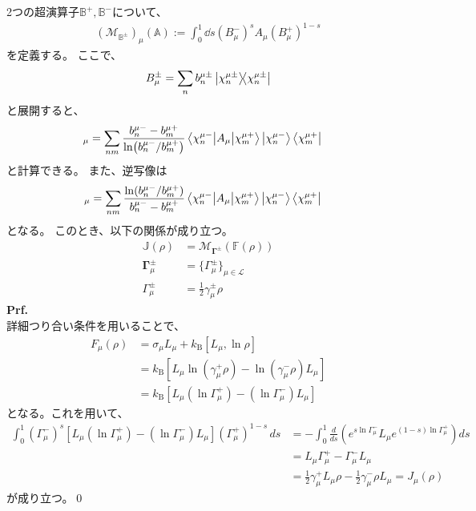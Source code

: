 \documentclass[a4paper,11pt]{jsarticle}
\numberwithin{equation}{section}
\begin{document}
2つの超演算子$\mathbb{B}^{+}, \mathbb{B}^{-} $について、
\begin{align}
    (\mathcal{M}_{\mathbb{B}^{\pm}} )_{\mu} (\mathbb{A}) := \int_{0}^{1} \dd{s} (B_{\mu}^{-})^{s} A_{\mu} (B_{\mu}^{+})^{1-s}
\end{align}
を定義する。
ここで、
\begin{align}
    B_{\mu}^{\pm} = \sum_{n} b_{n}^{\mu\pm} \ketbra{\chi_{n}^{\mu\pm}}
\end{align}
と展開すると、
\begin{align}
[\mathcal{M}_{\mathbb{B}^{\pm}}(\mathbb{A})]_{\mu}
&=
\sum_{n m}
\frac{b_{n}^{\mu -} - b_{m}^{\mu +}}
{\ln (b_{n}^{\mu -} / b_{m}^{\mu +})}
\mel{\chi_{n}^{\mu -}}{A_{\mu}}{\chi_{m}^{\mu +}}
\ket{\chi_{n}^{\mu -}}\bra{\chi_{m}^{\mu +}}
\end{align}
と計算できる。
また、逆写像は
\begin{align}
[\mathcal{M}_{\mathbb{B}^{\pm}}^{-1}(\mathbb{A})]_{\mu}
&=
\sum_{n m}
\frac{\ln (b_{n}^{\mu -} / b_{m}^{\mu +})}
{b_{n}^{\mu -} - b_{m}^{\mu +}}
\mel{\chi_{n}^{\mu -}}{A_{\mu}}{\chi_{m}^{\mu +}}
\ket{\chi_{n}^{\mu -}}\bra{\chi_{m}^{\mu +}}
\end{align}
となる。
このとき、以下の関係が成り立つ。
\begin{align}
    \mathbb{J}(\rho) &= \mathcal{M}_{\mathbf{\Gamma}^{\pm}}(\mathbb{F}(\rho))\\
    \mathbf{\Gamma}_{\mu}^{\pm} &=\{\Gamma_{\mu}^{\pm}\}_{\mu \in \mathcal{L}} \\
    \Gamma_{\mu}^{\pm} &= \frac{1}{2}\gamma_{\mu}^{\pm} \rho
\end{align}
\textbf{Prf.}\\
詳細つり合い条件を用いることで、
\begin{align}
F_{\mu}(\rho)
&= \sigma_{\mu} L_{\mu} + k_{\mathrm{B}} [L_{\mu}, \ln \rho] \\
&= k_{\mathrm{B}} \left[ L_{\mu} \ln(\gamma_{\mu}^{+} \rho) - \ln(\gamma_{\mu}^{-} \rho) L_{\mu} \right] \\
&= k_{\mathrm{B}} \left[ L_{\mu} (\ln \Gamma_{\mu}^{+}) - (\ln \Gamma_{\mu}^{-}) L_{\mu} \right]
\end{align}
となる。これを用いて、
\begin{align}
\int_{0}^{1} (\Gamma_{\mu}^{-})^{s}
\left[ L_{\mu} (\ln \Gamma_{\mu}^{+}) - (\ln \Gamma_{\mu}^{-}) L_{\mu} \right]
(\Gamma_{\mu}^{+})^{1-s} \, ds
&= -\int_{0}^{1} \frac{d}{ds}
\left( e^{s \ln \Gamma_{\mu}^{-}} L_{\mu} e^{(1-s) \ln \Gamma_{\mu}^{+}} \right) ds \\
&= L_{\mu} \Gamma_{\mu}^{+} - \Gamma_{\mu}^{-} L_{\mu} \\
&= \frac{1}{2}\gamma_{\mu}^{+} L_{\mu} \rho - \frac{1}{2}\gamma_{\mu}^{-} \rho L_{\mu}
= J_{\mu}(\rho)
\end{align}
が成り立つ。\qed\\
\end{document}
